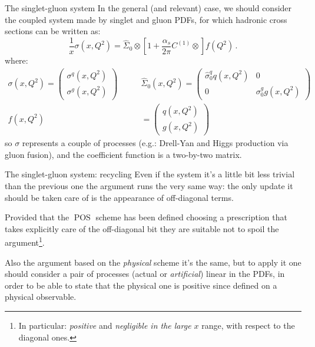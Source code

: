 \documentclass[9pt]{beamer}
\DeclareMathOperator{\pos}{POS}
\begin{document}
\begin{frame}{The singlet-gluon system}
    In the general (and relevant) case, we should consider the coupled system
    made by singlet and gluon PDFs, for which hadronic cross sections can be
    written as:
    \begin{equation*}
        \frac{1}{x} \sigma(x,Q^2)= \hat \Sigma_0\otimes \left[1
        +\frac{\alpha_s}{2\pi}  C^{(1)} \otimes \right] f(Q^2) \,.
    \end{equation*}
    where:
    \begin{align*}
        \sigma(x,Q^2)=\left(\begin{array}{c} \sigma^{q}(x,Q^2)\\ \sigma^{g} (x,Q^2)\end{array}\right) \qquad&
        \hat \Sigma_0(x,Q^2)=\left(\begin{array}{cc} \hat \sigma_0^{q} q (x,Q^2) &
                  0 \\0 & \sigma_0^{g} g (x,Q^2) \end{array}\right)\\
          f(x,Q^2)&=\left(\begin{array}{c} q(x,Q^2) \\ g(x,Q^2) \end{array}\right)
    \end{align*}
    so $\sigma$ represents a couple of processes (e.g.: Drell-Yan and Higgs
    production via gluon fusion), and the coefficient function is a two-by-two
    matrix.
\end{frame}

\begin{frame}{The singlet-gluon system: recycling}
    Even if the system it's a little bit less trivial than the previous one the
    argument runs the very same way: the only update it should be taken care of
    is the appearance of off-diagonal terms.

    Provided that the $\pos$ scheme has been defined choosing a prescription
    that takes explicitly care of the off-diagonal bit they are suitable not to
    spoil the argument\footnote{In particular: \textit{positive} and
    \textit{negligible in the large $x$} range, with respect to the diagonal
    ones.}.

    \vspace*{15pt}
    Also the argument based on the \textit{physical} scheme it's the same, but
    to apply it one should consider a pair of processes (actual or
    \textit{artificial}) linear in the PDFs, in order to be able to state that
    the physical one is positive since defined on a physical observable.
\end{frame}
\end{document}

